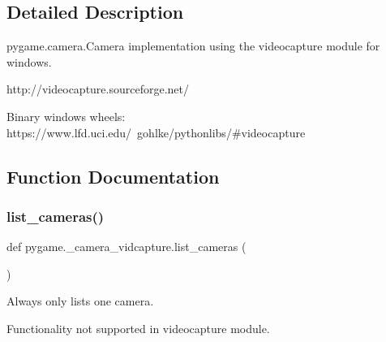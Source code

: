 \subsection{Detailed Description}
\begin{DoxyVerb}pygame.camera.Camera implementation using the videocapture module for windows.

http://videocapture.sourceforge.net/

Binary windows wheels:
  https://www.lfd.uci.edu/~gohlke/pythonlibs/#videocapture
\end{DoxyVerb}
 

\subsection{Function Documentation}
\mbox{\label{namespacepygame_1_1__camera__vidcapture_afcc113b39d566be7ff65ddb13d283ff3}} 
\subsubsection{\texorpdfstring{list\+\_\+cameras()}{list\_cameras()}}
{\footnotesize\ttfamily def pygame.\+\_\+camera\+\_\+vidcapture.\+list\+\_\+cameras (\begin{DoxyParamCaption}{ }\end{DoxyParamCaption})}

\begin{DoxyVerb}Always only lists one camera.

Functionality not supported in videocapture module.
\end{DoxyVerb}
 